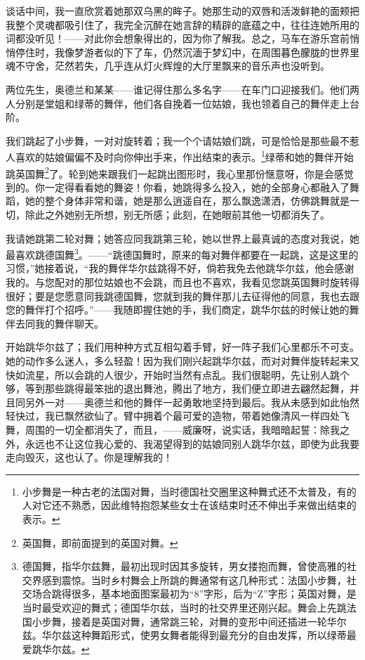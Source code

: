 \documentclass[12pt,oneside]{book}
\begin{document}
谈话中间，我一直欣赏着她那双乌黑的眸子。她那生动的双唇和活泼鲜艳的面颊把我整个灵魂都吸引住了，我完全沉醉在她言辞的精辟的底蕴之中，往往连她所用的词都没听见！——对此你会想象得出的，因为你了解我。总之，马车在游乐宫前悄悄停住时，我像梦游者似的下了车，仍然沉湎于梦幻中，在周围暮色朦胧的世界里魂不守舍，茫然若失，几乎连从灯火辉煌的大厅里飘来的音乐声也没听到。

两位先生，奥德兰和某某——谁记得住那么多名字——在车门口迎接我们。他们两人分别是堂姐和绿蒂的舞伴，他们各自挽着一位姑娘，我也领着自己的舞伴走上台阶。

我们跳起了小步舞，一对对旋转着；我一个个请姑娘们跳，可是恰恰是那些最不惹人喜欢的姑娘偏偏不及时向你伸出手来，作出结束的表示。\footnote{小步舞是一种古老的法国对舞，当时德国社交圈里这种舞式还不太普及，有的人对它还不熟悉，因此维特抱怨某些女士在该结束时还不伸出手来做出结束的表示。}绿蒂和她的舞伴开始跳英国舞\footnote{英国舞，即前面提到的英国对舞。}了。轮到她来跟我们一起跳出图形时，我心里那份惬意呀，你是会感觉到的。你一定得看看她的舞姿！你看，她跳得多么投入，她的全部身心都融入了舞蹈，她的整个身体非常和谐，她是那么逍遥自在，那么飘逸潇洒，仿佛跳舞就是一切，除此之外她别无所想，别无所感；此刻，在她眼前其他一切都消失了。

我请她跳第二轮对舞；她答应同我跳第三轮，她以世界上最真诚的态度对我说，她最喜欢跳德国舞\footnote{德国舞，指华尔兹舞，最初出现时因其多旋转，男女搂抱而舞，曾使高雅的社交界感到震惊。当时乡村舞会上所跳的舞通常有这几种形式：法国小步舞，社交场合跳得很多，基本地面图案最初为“8”字形，后为“Z”字形；英国对舞，是当时最受欢迎的舞式；德国华尔兹，当时的社交界里还刚兴起。舞会上先跳法国小步舞，接着是英国对舞，通常跳三轮，对舞的变形中间还插进一轮华尔兹。华尔兹这种舞蹈形式，使男女舞者能得到最充分的自由发挥，所以绿蒂最爱跳华尔兹。}。——“跳德国舞时，原来的每对舞伴都要在一起跳，这是这里的习惯，”她接着说，“我的舞伴华尔兹跳得不好，倘若我免去他跳华尔兹，他会感谢我的。与您配对的那位姑娘也不会跳，而且也不喜欢，我看见您跳英国舞时旋转得很好；要是您愿意同我跳德国舞，您就到我的舞伴那儿去征得他的同意，我也去跟您的舞伴打个招呼。”——我随即握住她的手，我们商定，跳华尔兹的时候让她的舞伴去同我的舞伴聊天。

开始跳华尔兹了；我们用种种方式互相勾着手臂，好一阵子我们心里都乐不可支。她的动作多么迷人，多么轻盈！因为我们刚兴起跳华尔兹，而对对舞伴旋转起来又快如流星，所以会跳的人很少，开始时当然有点乱。我们很聪明，先让别人跳个够，等到那些跳得最笨拙的退出舞池，腾出了地方，我们便立即进去翩然起舞，并且同另外一对——奥德兰和他的舞伴一起勇敢地坚持到最后。我从未感到如此怡然轻快过，我已飘然欲仙了。臂中拥着个最可爱的造物，带着她像清风一样四处飞舞，周围的一切全都消失了，而且，——威廉呀，说实话，我暗暗起誓：除我之外，永远也不让这位我心爱的、我渴望得到的姑娘同别人跳华尔兹，即使为此我要走向毁灭，这也认了。你是理解我的！
\end{document}
